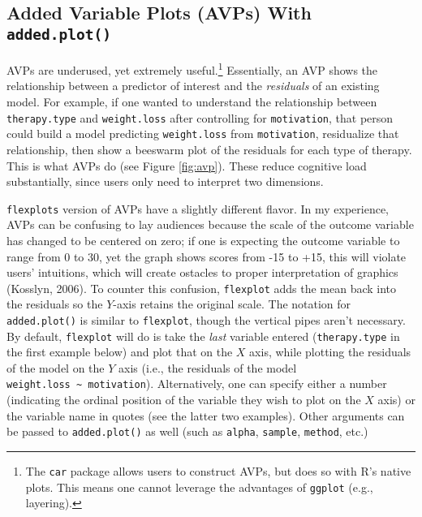 \documentclass[
  english,
  man]{apa6}
\begin{document}
\hypertarget{added-variable-plots-avps-with-added.plot}{%
\subsection{\texorpdfstring{Added Variable Plots (AVPs) With \texttt{added.plot()}}{Added Variable Plots (AVPs) With added.plot()}}\label{added-variable-plots-avps-with-added.plot}}

AVPs are underused, yet extremely useful.\footnote{The \texttt{car} package allows users to construct AVPs, but does so with R's native plots. This means one cannot leverage the advantages of \texttt{ggplot} (e.g., layering).} Essentially, an AVP shows the relationship between a predictor of interest and the \emph{residuals} of an existing model. For example, if one wanted to understand the relationship between \texttt{therapy.type} and \texttt{weight.loss} after controlling for \texttt{motivation}, that person could build a model predicting \texttt{weight.loss} from \texttt{motivation}, residualize that relationship, then show a beeswarm plot of the residuals for each type of therapy. This is what AVPs do (see Figure \ref{fig:avp}). These reduce cognitive load substantially, since users only need to interpret two dimensions.

\texttt{flexplot\textquotesingle{}s} version of AVPs have a slightly different flavor. In my experience, AVPs can be confusing to lay audiences because the scale of the outcome variable has changed to be centered on zero; if one is expecting the outcome variable to range from 0 to 30, yet the graph shows scores from -15 to +15, this will violate users' intuitions, which will create ostacles to proper interpretation of graphics (Kosslyn, 2006). To counter this confusion, \texttt{flexplot} adds the mean back into the residuals so the \(Y\)-axis retains the original scale. The notation for \texttt{added.plot()} is similar to \texttt{flexplot}, though the vertical pipes aren't necessary. By default, \texttt{flexplot} will do is take the \emph{last} variable entered (\texttt{therapy.type} in the first example below) and plot that on the \(X\) axis, while plotting the residuals of the model on the \(Y\) axis (i.e., the residuals of the model \texttt{weight.loss\ \textasciitilde{}\ motivation}). Alternatively, one can specify either a number (indicating the ordinal position of the variable they wish to plot on the \(X\) axis) or the variable name in quotes (see the latter two examples). Other arguments can be passed to \texttt{added.plot()} as well (such as \texttt{alpha}, \texttt{sample}, \texttt{method}, etc.)
\end{document}
